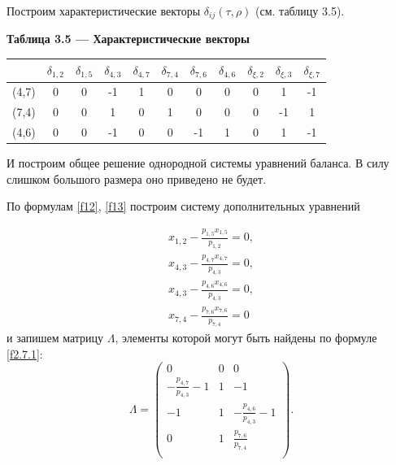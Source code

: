 \documentclass[14pt]{extarticle}%
\begin{document}
Построим характеристические векторы $\delta_{ij}(\tau,\rho)$ (см. таблицу 3.5).

\begin{center}
\textbf{Таблица 3.5 --- Характеристические векторы }\\
\begin{tabular}{c|cccccccccc}
 & $\delta _{1,2}$ & $\delta _{1,5}$ & $\delta _{4,3}$ & $\delta _{4,7}$ & $\delta _{7,4}$ & $\delta _{7,6}$ & $\delta _{4,6}$ & $\delta _{\xi,2}$ & $\delta _{\xi,3}$ & $\delta _{\xi,7}$ \\\hline
 (4,7)&0 & 0 & -1 & 1 & 0 & 0 & 0 & 0 & 1 & -1 \\
 (7,4)&0 & 0 & 1 & 0 & 1 & 0 & 0 & 0 & -1 & 1  \\
 (4,6)& 0 & 0 & -1 & 0 & 0 & -1 & 1 & 0 & 1 & -1 
\end{tabular}
\end{center}

И построим общее решение однородной системы уравнений баланса. В силу слишком большого размера оно приведено не будет.

По формулам \eqref{f12}, \eqref{f13} построим систему дополнительных уравнений

\begin{equation}\label{f3.2.23}
\begin{gathered}
x_{1,2}-\frac{p_{1,5} x_{1,5}}{p_{1,2}}=0,\\
x_{4,3}-\frac{p_{4,7} x_{4,7}}{p_{4,3}}=0,\\
x_{4,3}-\frac{p_{4,6} x_{4,6}}{p_{4,3}}=0,\\
x_{7,4}-\frac{p_{7,6} x_{7,6}}{p_{7,4}}=0
\end{gathered}
\end{equation}
и запишем матрицу $\Lambda$, элементы которой могут быть найдены по формуле \eqref{f2.7.1}:
$$
\Lambda=\left(
\begin{array}{ccc}
 0 & 0 & 0 \\
 -\frac{p_{4,7}}{p_{4,3}}-1 & 1 & -1 \\
 -1 & 1 & -\frac{p_{4,6}}{p_{4,3}}-1 \\
 0 & 1 & \frac{p_{7,6}}{p_{7,4}} \\
\end{array}
\right).
$$
\end{document}
